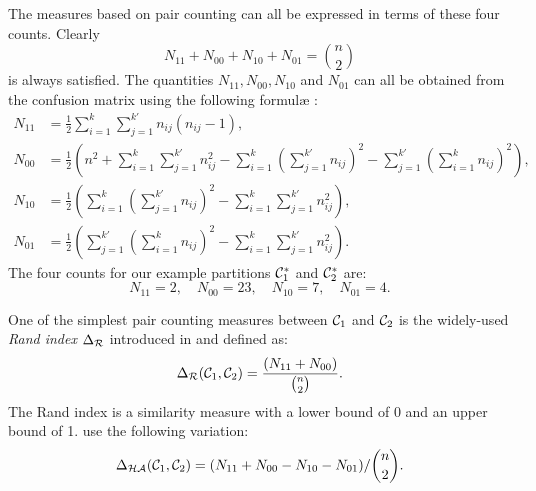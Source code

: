 The measures based on pair counting can all be expressed in terms of these
four counts.  Clearly \[N_{11}+N_{00}+N_{10}+N_{01} = \binom{n}{2}\] is always
satisfied.  The quantities $N_{11},N_{00},N_{10}$ and $N_{01}$ can all be
obtained from the confusion matrix using the following formul\ae
\citep{hubert-arabie-1985}:
\begin{align*}
  N_{11} &= \frac{1}{2} \sum_{i=1}^{k} \sum_{j=1}^{k'} n_{ij}(n_{ij}-1),\\
  N_{00} &= \frac{1}{2} \left(n^2 + \sum_{i=1}^{k} \sum_{j=1}^{k'} n_{ij}^2
                             - \sum_{i=1}^{k}
                                \left(\sum_{j=1}^{k'} n_{ij} \right)^2
                             - \sum_{j=1}^{k'}
                                \left(\sum_{i=1}^{k} n_{ij} \right)^2
                       \right),\\
  N_{10} &= \frac{1}{2} \left(\sum_{i=1}^{k}
                              \left(\sum_{j=1}^{k'} n_{ij} \right)^2
                             - \sum_{i=1}^{k} \sum_{j=1}^{k'} n_{ij}^2
                       \right),\\
  N_{01} &= \frac{1}{2} \left(\sum_{j=1}^{k'}
                              \left(\sum_{i=1}^{k} n_{ij} \right)^2
                             - \sum_{i=1}^{k} \sum_{j=1}^{k'} n_{ij}^2
                       \right).
\end{align*}
The four counts for our example partitions $\mathcal{C}^*_1$ and $\mathcal{C}^*_2$ are:
\begin{equation*}
  N_{11} = 2,\quad
  N_{00} = 23,\quad
  N_{10} = 7,\quad
  N_{01} = 4.
\end{equation*}

One of the simplest pair counting measures between $\mathcal{C}_1$ and $\mathcal{C}_2$ is
the widely-used \textit{Rand index} $\Delta_{\mathcal{R}}$ introduced in
\citep{rand-1971} and defined as:
\begin{equation*}
\Delta_{\mathcal{R}}(\mathcal{C}_1,\mathcal{C}_2) = \frac{(N_{11}+N_{00})}{\binom{n}{2}}.
\end{equation*}
The Rand index is a similarity measure with a lower bound of 0 and an upper
bound of 1.  \citet{hubert-arabie-1985} use the following variation:
\[\Delta_{\mathcal{HA}}(\mathcal{C}_1,\mathcal{C}_2) = (N_{11}+N_{00}-N_{10}-N_{01})/\binom{n}{2}.\]

